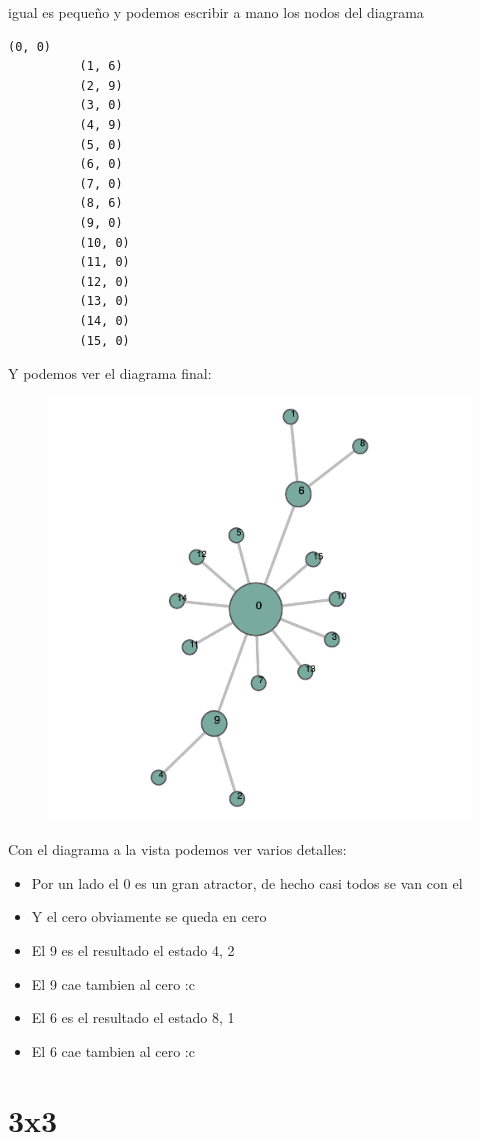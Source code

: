 \documentclass[12pt, fleqn]{report}                             %
\theoremstyle{break}                                            %
\begin{document}
       igual es pequeño y podemos escribir a mano los nodos del diagrama
        \begin{lstlisting}[gobble=9]
          (0, 0)
          (1, 6)
          (2, 9)
          (3, 0)
          (4, 9)
          (5, 0)
          (6, 0)
          (7, 0)
          (8, 6)
          (9, 0)
          (10, 0)
          (11, 0)
          (12, 0)
          (13, 0)
          (14, 0)
          (15, 0)
        \end{lstlisting}

        Y podemos ver el diagrama final:
        \begin{figure}[ht!]
          \centering
          \includegraphics[height=0.4\textwidth]{dif2.png}
        \end{figure}

        Con el diagrama a la vista podemos ver varios detalles:
        \begin{itemize}
          \item Por un lado el 0 es un gran atractor, de hecho casi todos se van con el
          \item Y el cero obviamente se queda en cero
          \item El 9 es el resultado el estado 4, 2
          \item El 9 cae tambien al cero :c
          \item El 6 es el resultado el estado 8, 1
          \item El 6 cae tambien al cero :c
        \end{itemize}

      \clearpage
      \section{3x3}
\end{document}
